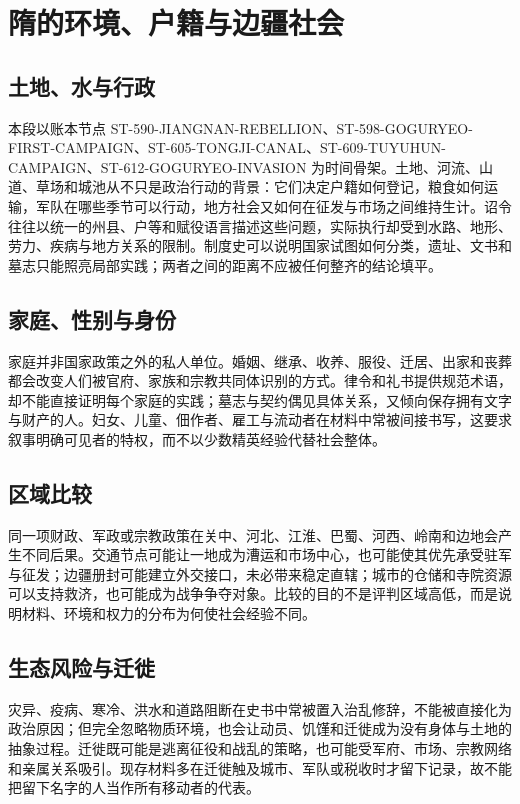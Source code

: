 \section{隋的环境、户籍与边疆社会}
\label{sec:sui-environment-households-frontiers}

\subsection{土地、水与行政}
本段以账本节点 ST-590-JIANGNAN-REBELLION、ST-598-GOGURYEO-FIRST-CAMPAIGN、ST-605-TONGJI-CANAL、ST-609-TUYUHUN-CAMPAIGN、ST-612-GOGURYEO-INVASION 为时间骨架。土地、河流、山道、草场和城池从不只是政治行动的背景：它们决定户籍如何登记，粮食如何运输，军队在哪些季节可以行动，地方社会又如何在征发与市场之间维持生计。诏令往往以统一的州县、户等和赋役语言描述这些问题，实际执行却受到水路、地形、劳力、疾病与地方关系的限制。制度史可以说明国家试图如何分类，遗址、文书和墓志只能照亮局部实践；两者之间的距离不应被任何整齐的结论填平。

\subsection{家庭、性别与身份}
家庭并非国家政策之外的私人单位。婚姻、继承、收养、服役、迁居、出家和丧葬都会改变人们被官府、家族和宗教共同体识别的方式。律令和礼书提供规范术语，却不能直接证明每个家庭的实践；墓志与契约偶见具体关系，又倾向保存拥有文字与财产的人。妇女、儿童、佃作者、雇工与流动者在材料中常被间接书写，这要求叙事明确可见者的特权，而不以少数精英经验代替社会整体。

\subsection{区域比较}
同一项财政、军政或宗教政策在关中、河北、江淮、巴蜀、河西、岭南和边地会产生不同后果。交通节点可能让一地成为漕运和市场中心，也可能使其优先承受驻军与征发；边疆册封可能建立外交接口，未必带来稳定直辖；城市的仓储和寺院资源可以支持救济，也可能成为战争争夺对象。比较的目的不是评判区域高低，而是说明材料、环境和权力的分布为何使社会经验不同。

\subsection{生态风险与迁徙}
灾异、疫病、寒冷、洪水和道路阻断在史书中常被置入治乱修辞，不能被直接化为政治原因；但完全忽略物质环境，也会让动员、饥馑和迁徙成为没有身体与土地的抽象过程。迁徙既可能是逃离征役和战乱的策略，也可能受军府、市场、宗教网络和亲属关系吸引。现存材料多在迁徙触及城市、军队或税收时才留下记录，故不能把留下名字的人当作所有移动者的代表。

